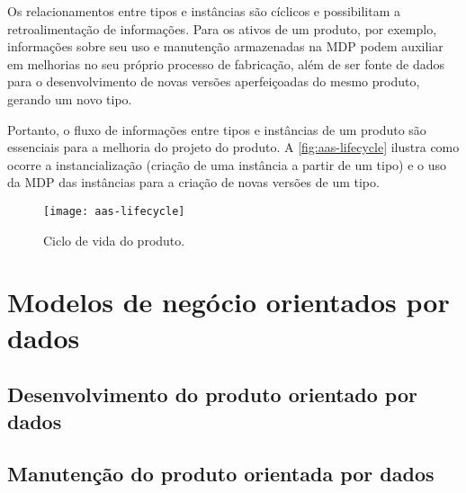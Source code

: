 	Os relacionamentos entre tipos e instâncias são cíclicos e possibilitam a retroalimentação de informações. Para os ativos de um produto, por exemplo, informações sobre seu uso e manutenção armazenadas na MDP podem auxiliar em melhorias no seu próprio processo de fabricação, além de ser fonte de dados para o desenvolvimento de novas versões aperfeiçoadas do mesmo produto, gerando um novo tipo.
	
	Portanto, o fluxo de informações entre tipos e instâncias de um produto são essenciais para a melhoria do projeto do produto. A \autoref{fig:aas-lifecycle} ilustra como ocorre a instancialização (criação de uma instância a partir de um tipo) e o uso da MDP das instâncias para a criação de novas versões de um tipo.
	
	\begin{figure}[htb!]
		\centering
		\caption{Ciclo de vida do produto.}
		\label{fig:aas-lifecycle}
		\texttt{[image: aas-lifecycle]}
	\end{figure}

\section{ Modelos de negócio orientados por dados }



\subsection{ Desenvolvimento do produto orientado por dados   }

\lipsum[1-1]

\subsection{ Manutenção do produto orientada por dados }

\lipsum[1-1]